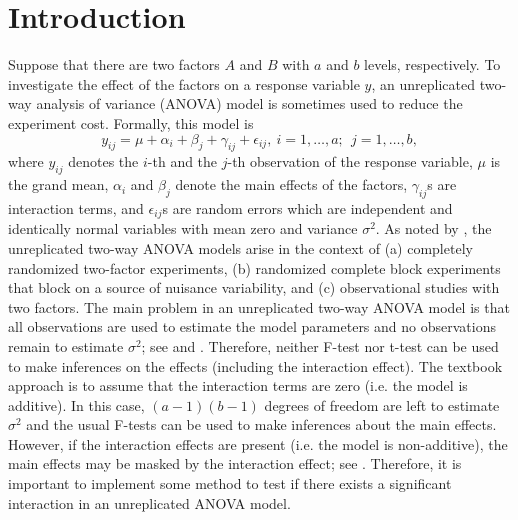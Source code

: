 \section{Introduction}\label{sec:introduction}
\noindent Suppose that there are two factors $A$ and $B$ with $a$ and $b$ levels, respectively. To investigate the effect of the factors on a response variable $y$, an unreplicated two-way analysis of variance (ANOVA) {model is sometimes used} to reduce the experiment cost. Formally, this model is 
\begin{equation} \label{eq:1}
	y_{ij}=\mu +\alpha_i+\beta _j+\gamma _{ij}+\epsilon_{ij},\ i=1,\dots ,a;\ \ j=1,\dots ,b,
\end{equation}
where $y_{ij}$ denotes the $i$-th and the $j$-th observation of the response variable, $\mu $ is the grand mean, $\alpha_i$ and $\beta_j$ denote the main effects of the factors, $\gamma_{ij}$s are interaction terms, and $\epsilon_{ij}$s are random errors which are independent and identically normal variables with mean zero and variance $\sigma^2$. As noted by \citet{Franck:2016}, the unreplicated two-way ANOVA models arise in the context of (a) completely randomized two-factor experiments, (b) randomized complete block experiments that block on a source of nuisance variability, and (c) observational studies with two factors. The main problem in an unreplicated two-way ANOVA model is that all observations are used to estimate the model parameters and no observations remain to estimate $\sigma^2$; see \citet{SKK:2018} and \citet{KKSA:2007}. Therefore, neither F-test nor t-test can be used to make inferences on the effects (including the interaction effect). The textbook approach is to assume that the interaction terms are zero (i.e. the model is additive). In this case, $\left(a-1\right)\left(b-1\right)$ degrees of freedom are left to estimate $\sigma^2$ and the usual F-tests can be used to make inferences about the main effects. However, if the interaction effects are present (i.e. the model is non-additive), the main effects may be masked by the interaction effect; see \citet{Montgomery:2017}. Therefore, it is important to implement some method to test if there exists a significant interaction in an unreplicated ANOVA model.


